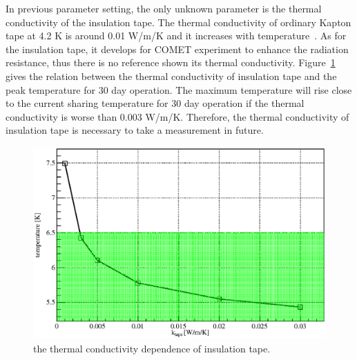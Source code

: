 In previous parameter setting, the only unknown parameter is the thermal conductivity of the insulation tape.
The thermal conductivity of ordinary Kapton tape at 4.2 K is around 0.01 W/m/K and it increases with temperature~\cite{rss90}.
As for the insulation tape, it develops for COMET experiment to enhance the radiation resistance, thus there is no reference shown its thermal conductivity.
Figure~\ref{4tape} gives the relation between the thermal conductivity of insulation tape and the peak temperature for 30 day operation.
The maximum temperature will rise close to the current sharing temperature for 30 day operation if the thermal conductivity is worse than 0.003 W/m/K.
Therefore, the thermal conductivity of insulation tape is necessary to take a measurement in future.
 \begin{figure}[H]
  \centering
  \includegraphics[scale=0.45]{chapter6/fig/tape.eps}
  \caption{ the thermal conductivity dependence of insulation tape.}
  \label{4tape}
 \end{figure}


